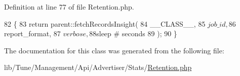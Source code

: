 Definition at line 77 of file Retention.\-php.


\begin{DoxyCode}
82       \{
83         \textcolor{keywordflow}{return} parent::fetchRecordsInsight(
84             \_\_CLASS\_\_,
85             $job\_id,
86             $report\_format,
87             $verbose,
88             $sleep # seconds
89         );
90     \}
\end{DoxyCode}


The documentation for this class was generated from the following file\-:\begin{DoxyCompactItemize}
\item 
lib/\-Tune/\-Management/\-Api/\-Advertiser/\-Stats/\hyperlink{Retention_8php}{Retention.\-php}\end{DoxyCompactItemize}
